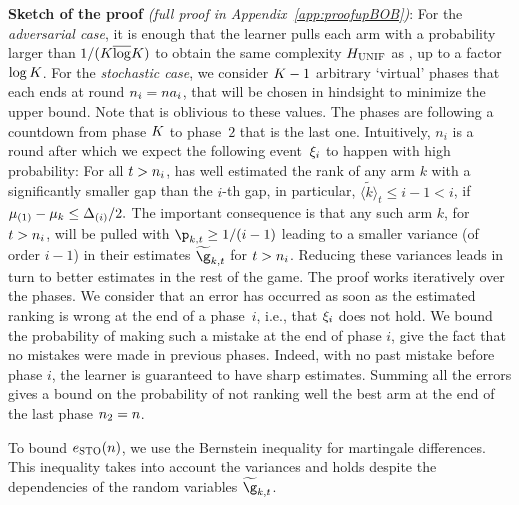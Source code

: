 %
\noindent\textbf{Sketch of the proof} 
\textit{(full proof in 
	Appendix~\ref{app:proofupBOB})}:
For the \textit{adversarial case}, it is enough that the learner pulls 
each arm with a probability larger than $1/(K\overline\log K)$ to obtain
the same complexity $H_{{\normalfont \textsc{UNIF}}}$ as \RULE,  up to a factor $\log K$.
For the \textit{stochastic case},
we consider $K-1$  arbitrary `virtual' 
phases that each  ends at round 
$n_i=na_i$, that will be chosen in hindsight 
to minimize the upper bound. Note that \Pone{} is oblivious to these values.
The phases are following a countdown from phase $K$ to 
phase~$2$ that is the last one.
Intuitively, $n_i$ is a round after which we expect the 
following event~$\xi_i$ to happen with  
high probability: 
For all $t>n_i$, \Pone{} has 
well estimated the rank of any arm $k$ with a significantly smaller 
gap than the $i$-th gap, in particular, $\tilde{\langle k \rangle}_t\leq i-1< i$, 
if $ \mu_{(1)}-\mu_k\leq\Delta_{(i)}/2.$
The important consequence  is that any such arm $k$, for $t>n_i$, will be pulled with $\learnerDist_{k,t}\geq 1/(i-1)$ leading to a 
smaller variance (of order $i-1$) in their estimates 
$\estGainVector_{k,t}$ for $t>n_i$. 
Reducing these variances leads 
in turn to  better estimates in the 
rest of the game.
The proof works iteratively over the phases. We 
consider that an error has occurred as soon as the 
estimated ranking is wrong at the end of a phase~$i$, i.e., 
that $\xi_i$ does not hold. We bound the  probability 
of making such a mistake at the end of phase $i$, give 
the fact that no mistakes were made in previous phases.
Indeed, with no past mistake before phase $i$, the 
learner is guaranteed to have sharp estimates.
Summing all the errors gives a bound on the probability 
of not ranking well the best 
arm at the end of the last phase $n_2=n$.

To bound $e_{\textsc{STO}}(n)$,
we use the Bernstein inequality for martingale  differences. This inequality takes into account the 
variances and holds despite the dependencies of the random 
variables $\estGainVector_{k,t}$.

